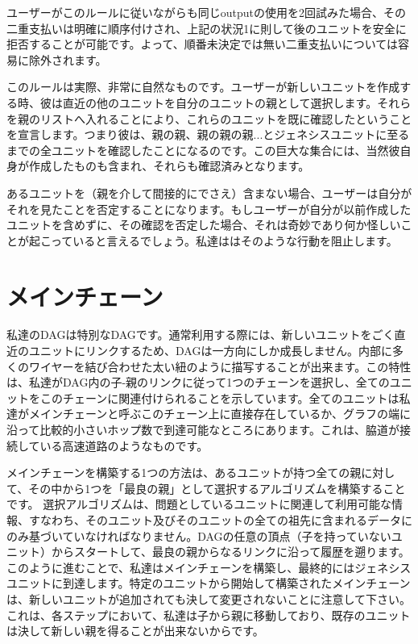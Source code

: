 \documentclass[a4paper, dvipdfmx]{jsarticle}
\begin{document}
ユーザーがこのルールに従いながらも同じoutputの使用を2回試みた場合、その二重支払いは明確に順序付けされ、上記の状況1に則して後のユニットを安全に拒否することが可能です。よって、順番未決定では無い二重支払いについては容易に除外されます。

このルールは実際、非常に自然なものです。ユーザーが新しいユニットを作成する時、彼は直近の他のユニットを自分のユニットの親として選択します。それらを親のリストへ入れることにより、これらのユニットを既に確認したということを宣言します。つまり彼は、親の親、親の親の親...とジェネシスユニットに至るまでの全ユニットを確認したことになるのです。この巨大な集合には、当然彼自身が作成したものも含まれ、それらも確認済みとなります。

あるユニットを（親を介して間接的にでさえ）含まない場合、ユーザーは自分がそれを見たことを否定することになります。もしユーザーが自分が以前作成したユニットを含めずに、その確認を否定した場合、それは奇妙であり何か怪しいことが起こっていると言えるでしょう。私達ははそのような行動を阻止します。

\section{メインチェーン}
私達のDAGは特別なDAGです。通常利用する際には、新しいユニットをごく直近のユニットにリンクするため、DAGは一方向にしか成長しません。内部に多くのワイヤーを結び合わせた太い紐のように描写することが出来ます。この特性は、私達がDAG内の子-親のリンクに従って1つのチェーンを選択し、全てのユニットをこのチェーンに関連付けられることを示しています。全てのユニットは私達がメインチェーンと呼ぶこのチェーン上に直接存在しているか、グラフの端に沿って比較的小さいホップ数で到達可能なところにあります。これは、脇道が接続している高速道路のようなものです。

メインチェーンを構築する1つの方法は、あるユニットが持つ全ての親に対して、その中から1つを「最良の親」として選択するアルゴリズムを構築することです。 選択アルゴリズムは、問題としているユニットに関連して利用可能な情報、すなわち、そのユニット及びそのユニットの全ての祖先に含まれるデータにのみ基づいていなければなりません。DAGの任意の頂点（子を持っていないユニット）からスタートして、最良の親からなるリンクに沿って履歴を遡ります。このように進むことで、私達はメインチェーンを構築し、最終的にはジェネシスユニットに到達します。特定のユニットから開始して構築されたメインチェーンは、新しいユニットが追加されても決して変更されないことに注意して下さい。これは、各ステップにおいて、私達は子から親に移動しており、既存のユニットは決して新しい親を得ることが出来ないからです。
\end{document}
